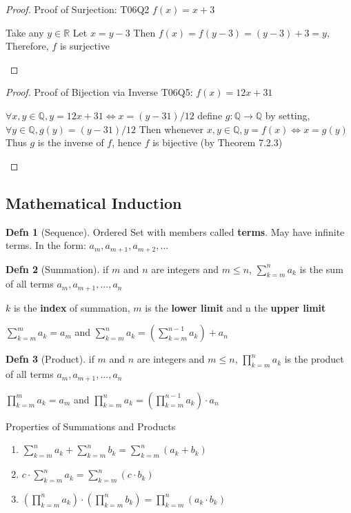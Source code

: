 \documentclass[a4paper]{article}
\theoremstyle{definition}
\newtheorem*{defn}{Defn}
\newenvironment{theorem}[1]
  {\renewcommand\theinnertheorem{#1}\innertheorem}
  {\endinnertheorem}
\begin{document}
\begin{proof} Proof of Surjection: T06Q2 $f(x) = x+3$
  \begin{numpf*}
    \pfln Take any $y \in \mathbb{R}$
    \pfln Let $x = y - 3$
    \pfln Then $f(x) = f(y-3) = (y-3)+3 = y$, Therefore, $f$ is surjective
  \end{numpf*}
\end{proof}
\begin{proof} Proof of Bijection via Inverse T06Q5: $f(x) = 12x+31$
  \begin{numpf*}
    \pfln $\forall x,y \in \mathbb{Q}, y = 12x + 31 \iff x = (y-31)/12$
    \pfln define $g: \mathbb{Q} \to \mathbb{Q}$ by setting, $\forall y \in \mathbb{Q}, g(y) = (y-31)/12$
    \pfln Then whenever $x,y \in \mathbb{Q}, y=f(x) \iff x = g(y)$
    \pfln Thus $g$ is the inverse of $f$, hence $f$ is bijective (by Theorem 7.2.3)
  \end{numpf*}
\end{proof}


\subsection*{Mathematical Induction}

\begin{defn}[Sequence] Ordered Set with members called \textbf{terms}. May have infinite terms. In the form: $a_m, a_{m+1}, a_{m+2}, ...$
\end{defn}

\begin{defn}[Summation] 
  if $m$ and $n$ are integers and $m \leq n$, $\sum_{k=m}^{n}a_k$ is the sum of all terms $a_m, a_{m+1},...,a_n$

  $k$ is the \textbf{index} of summation, $m$ is the \textbf{lower limit} and n the \textbf{upper limit}

  $\sum^{m}_{k=m}a_k = a_m$ and $\sum^{n}_{k=m}a_k = (\sum^{n-1}_{k=m}a_k) + a_n$
\end{defn}

\begin{defn}[Product] 
  if $m$ and $n$ are integers and $m \leq n$, $\prod_{k=m}^{n}a_k$ is the product of all terms $a_m, a_{m+1},...,a_n$

  $\prod^{m}_{k=m}a_k = a_m$ and $\prod^{n}_{k=m}a_k = (\prod^{n-1}_{k=m}a_k) \cdot a_n$
\end{defn}

\begin{theorem}{5.1.1} Properties of Summations and Products
  \begin{enumerate}
    \item $\sum^{n}_{k=m}a_k + \sum^n_{k=m}b_k = \sum^n_{k=m}(a_k + b_k)$
    \item $c \cdot \sum^{n}_{k=m}a_k = \sum^n_{k=m}(c \cdot b_k)$
    \item $(\prod^{n}_{k=m}a_k) \cdot (\prod^n_{k=m}b_k) = \prod^n_{k=m}(a_k \cdot b_k)$
  \end{enumerate}
\end{theorem}
\end{document}
